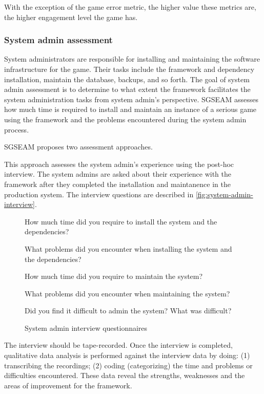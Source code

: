 With the exception of the game error metric, the higher value these metrics are, the higher engagement 
level the game has.

\subsubsection{System admin assessment}

System administrators are responsible for installing and maintaining the software infrastructure
for the game. Their tasks include the framework and dependency installation, maintain the database, 
backups, and so forth. The goal of system admin assessment is to determine to what extent the 
framework facilitates the system administration tasks from system admin's perspective. SGSEAM 
assesses how much time is required to install and maintain an instance of a serious game using the 
framework and the problems encountered  during the system admin process.
 
SGSEAM proposes two assessment approaches.

\label{Post-hoc system admin interview}

This approach assesses the system admin's experience using the post-hoc interview. The system admins 
are asked about their experience with the framework after they completed the installation and maintanence
 in the production system. The interview questions are described in \autoref{fig:system-admin-interview}.

\begin{figure}[ht!]
\begin{mybox}
\begin{compactenum}
\item How much time did you require to install the system and the dependencies?
\item What problems did you encounter when installing the system and the dependencies?
\item How much time did you require to maintain the system?
\item What problems did you encounter when maintaining the system?
\item Did you find it difficult to admin the system? What was difficult?
\end{compactenum}
\end{mybox}
\caption{System admin interview questionnaires}
\label{fig:system-admin-interview}  
\end{figure}

The interview should be tape-recorded. Once the interview is completed, qualitative data
analysis is performed against the interview data by doing: (1) transcribing the recordings; 
(2) coding (categorizing) the time and problems or difficulties encountered. These data reveal the 
strengths, weaknesses and the areas of improvement for the framework.

